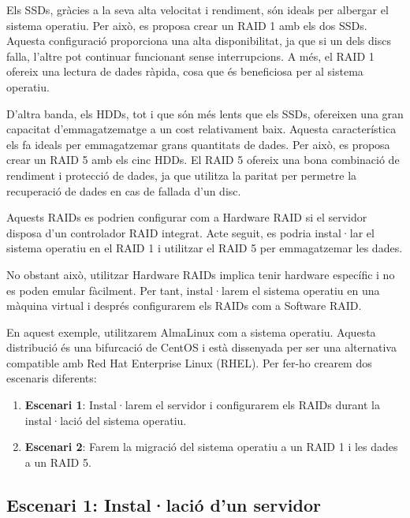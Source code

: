 Els SSDs, gràcies a la seva alta velocitat i rendiment, són ideals per albergar el sistema operatiu. Per això, es proposa crear un RAID 1 amb els dos SSDs. Aquesta configuració proporciona una alta disponibilitat, ja que si un dels discs falla, l'altre pot continuar funcionant sense interrupcions. A més, el RAID 1 ofereix una lectura de dades ràpida, cosa que és beneficiosa per al sistema operatiu.

D'altra banda, els HDDs, tot i que són més lents que els SSDs, ofereixen una gran capacitat d'emmagatzematge a un cost relativament baix. Aquesta característica els fa ideals per emmagatzemar grans quantitats de dades. Per això, es proposa crear un RAID 5 amb els cinc HDDs. El RAID 5 ofereix una bona combinació de rendiment i protecció de dades, ja que utilitza la paritat per permetre la recuperació de dades en cas de fallada d'un disc.

\begin{info}
Aquests RAIDs es podrien configurar com a Hardware RAID si el servidor disposa d'un controlador RAID integrat. Acte seguit, es podria instal·lar el sistema operatiu en el RAID 1 i utilitzar el RAID 5 per emmagatzemar les dades.
\end{info}

\begin{warning}
No obstant això, utilitzar Hardware RAIDs implica tenir hardware específic i no es poden emular fàcilment. Per tant, instal·larem el sistema operatiu en una màquina virtual i després configurarem els RAIDs com a Software RAID.
\end{warning}

En aquest exemple, utilitzarem AlmaLinux com a sistema operatiu. Aquesta distribució és una bifurcació de CentOS i està dissenyada per ser una alternativa compatible amb Red Hat Enterprise Linux (RHEL). Per fer-ho crearem dos escenaris diferents:

\begin{enumerate}
        \item \textbf{Escenari 1}: Instal·larem el servidor i configurarem els RAIDs durant la instal·lació del sistema operatiu. 
        \item \textbf{Escenari 2}: Farem la migració del sistema operatiu a un RAID 1 i les dades a un RAID 5.
\end{enumerate}


\subsection{Escenari 1: Instal·lació d'un servidor}\label{escenari-1-instal·lació-del-sistema-operatiu}

